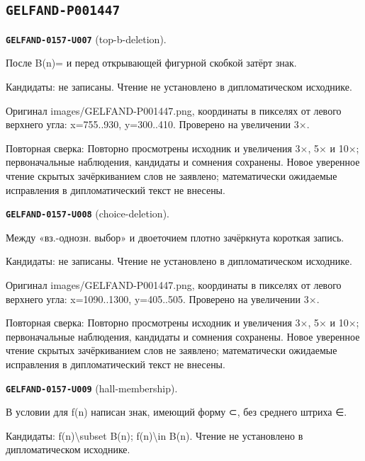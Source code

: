 \subsection*{\texttt{GELFAND-P001447}}
\par\noindent\leavevmode{}\label{GELFAND-0157-U007}\label{GELFAND-P001447:top-b-deletion}\textbf{\texttt{GELFAND-0157-U007}} (top-b-deletion).\nopagebreak[4]\par
После B(n)= и перед открывающей фигурной скобкой затёрт знак.\par
Кандидаты: не записаны. Чтение не установлено в дипломатическом исходнике.\par
Оригинал images/GELFAND-P001447.png, координаты в пикселях от левого верхнего угла: x=755..930, y=300..410. Проверено на увеличении 3×.\par
Повторная сверка: Повторно просмотрены исходник и увеличения 3×, 5× и 10×; первоначальные наблюдения, кандидаты и сомнения сохранены. Новое уверенное чтение скрытых зачёркиванием слов не заявлено; математически ожидаемые исправления в дипломатический текст не внесены.\par\medskip
\par\noindent\leavevmode{}\label{GELFAND-0157-U008}\label{GELFAND-P001447:choice-deletion}\textbf{\texttt{GELFAND-0157-U008}} (choice-deletion).\nopagebreak[4]\par
Между «вз.-однозн. выбор» и двоеточием плотно зачёркнута короткая запись.\par
Кандидаты: не записаны. Чтение не установлено в дипломатическом исходнике.\par
Оригинал images/GELFAND-P001447.png, координаты в пикселях от левого верхнего угла: x=1090..1300, y=405..505. Проверено на увеличении 3×.\par
Повторная сверка: Повторно просмотрены исходник и увеличения 3×, 5× и 10×; первоначальные наблюдения, кандидаты и сомнения сохранены. Новое уверенное чтение скрытых зачёркиванием слов не заявлено; математически ожидаемые исправления в дипломатический текст не внесены.\par\medskip
\par\noindent\leavevmode{}\label{GELFAND-0157-U009}\label{GELFAND-P001447:hall-membership}\textbf{\texttt{GELFAND-0157-U009}} (hall-membership).\nopagebreak[4]\par
В условии для f(n) написан знак, имеющий форму ⊂, без среднего штриха ∈.\par
Кандидаты: f(n)\textbackslash{}subset B(n); f(n)\textbackslash{}in B(n). Чтение не установлено в дипломатическом исходнике.\par
